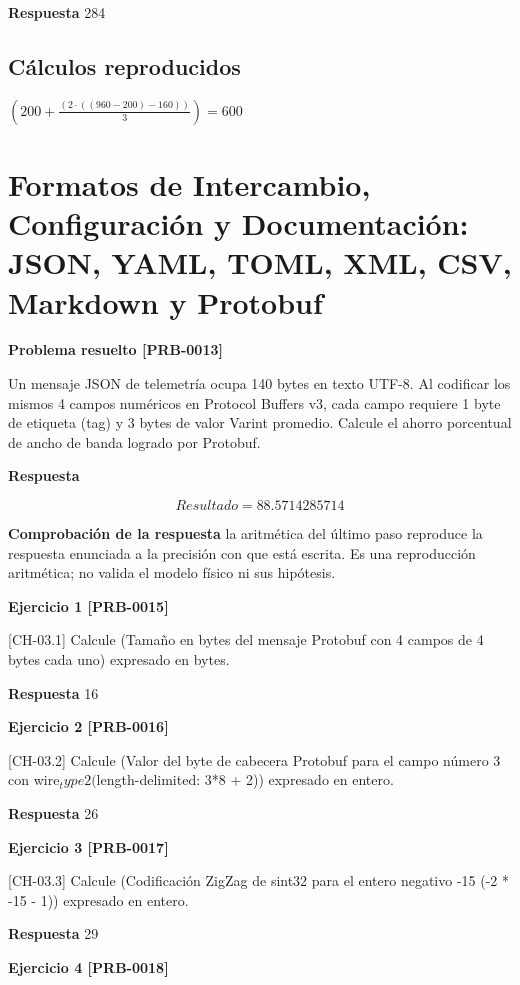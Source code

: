 \documentclass{book}
\begin{document}
\noindent\textbf{Respuesta} 284

\subsection*{Cálculos reproducidos}

\(\left(200+\frac{\left(2\cdot \left(\left(960-200\right)-160\right)\right)}{3}\right) = 600\)

\section{Formatos de Intercambio, Configuración y Documentación: JSON, YAML, TOML, XML, CSV, Markdown y Protobuf}

\noindent\textbf{Problema resuelto [PRB-0013]}

Un mensaje JSON de telemetría ocupa 140 bytes en texto UTF-8. Al codificar los mismos 4 campos numéricos en Protocol Buffers v3, cada campo requiere 1 byte de etiqueta (tag) y 3 bytes de valor Varint promedio. Calcule el ahorro porcentual de ancho de banda logrado por Protobuf.

\noindent\textbf{Respuesta}

\[
Resultado = 88.5714285714
\]

\noindent\textbf{Comprobación de la respuesta} la aritmética del último paso reproduce la respuesta enunciada a la precisión con que está escrita. Es una reproducción aritmética; no valida el modelo físico ni sus hipótesis.

\noindent\textbf{Ejercicio 1 [PRB-0015]}

[CH-03.1] Calcule (Tamaño en bytes del mensaje Protobuf con 4 campos de 4 bytes cada uno) expresado en bytes.

\noindent\textbf{Respuesta} 16

\noindent\textbf{Ejercicio 2 [PRB-0016]}

[CH-03.2] Calcule (Valor del byte de cabecera Protobuf para el campo número 3 con wire\(_type 2 (\)length-delimited: 3*8 + 2)) expresado en entero.

\noindent\textbf{Respuesta} 26

\noindent\textbf{Ejercicio 3 [PRB-0017]}

[CH-03.3] Calcule (Codificación ZigZag de sint32 para el entero negativo -15 (-2 * -15 - 1)) expresado en entero.

\noindent\textbf{Respuesta} 29

\noindent\textbf{Ejercicio 4 [PRB-0018]}
\end{document}
